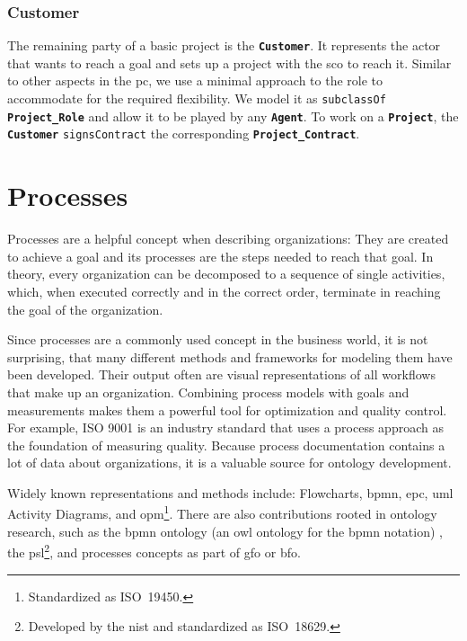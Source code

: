 \documentclass[a4paper, DIV=13, BCOR=0cm]{scrbook}
\newcommand{\class}[1]{\texttt{\textbf{#1}}}
\newcommand{\relation}[1]{\texttt{#1}}
\begin{document}
\subsubsection{Customer}
The remaining party of a basic project is the \class{Customer}. It represents the actor that wants to reach a goal and sets up a project with the \gls{sco} to reach it. Similar to other aspects in the \gls{pc}, we use a minimal approach to the role to accommodate for the required flexibility. We model it as \relation{subclassOf} \class{Project\_Role} and allow it to be played by any \class{Agent}. To work on a \class{Project}, the \class{Customer} \relation{signsContract} the corresponding \class{Project\_Contract}.

\section{Processes }
\label{processes}
Processes are a helpful concept when describing organizations: They are created to achieve a goal and its processes are the steps needed to reach that goal. \cite[p.\,5, Definition 1.1]{Weske:2019aa} In theory, every organization can be decomposed to a sequence of single activities, which, when executed correctly and in the correct order, terminate in reaching the goal of the organization.

Since processes are a commonly used concept in the business world, it is not surprising, that many different methods and frameworks for modeling them have been developed. Their output often are visual representations of all workflows that make up an organization. Combining process models with goals and measurements makes them a powerful tool for optimization and quality control. For example, ISO 9001 is an industry standard that uses a process approach as the foundation of measuring quality. \cite{iso-process-approach} Because process documentation contains a lot of data about organizations, it is a valuable source for ontology development.

Widely known representations and methods include: Flowcharts, \gls{bpmn}, \gls{epc}, \gls{uml} Activity Diagrams, and \gls{opm}\footnote{Standardized as ISO~19450.}. There are also contributions rooted in ontology research, such as the \gls{bpmn} ontology (an \gls{owl} ontology for the \gls{bpmn} notation) \cite{2014foisbpmn}, the \gls{psl}\footnote{Developed by the \gls{nist} and standardized as ISO~18629.}, and processes concepts as part of \gls{gfo} or \gls{bfo}.
\end{document}
